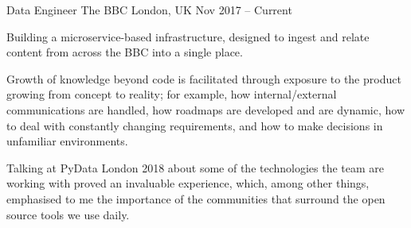 \begin{cventries}

     \cventry
     {Data Engineer}
     {The BBC}
     {London, UK}
     {Nov 2017 – Current}

     {
         \begin{cvitems}
         
             \item{Building a microservice-based infrastructure, designed to ingest and relate content from across the BBC into a single place.}
             \item{Growth of knowledge beyond code is facilitated through exposure to the product growing from concept to reality; for example, how internal/external communications are handled, how roadmaps are developed and are dynamic, how to deal with constantly changing requirements, and how to make decisions in unfamiliar environments.}
             \item{Talking at PyData London 2018 about some of the technologies the team are working with proved an invaluable experience, which, among other things, emphasised to me the importance of the communities that surround the open source tools we use daily.}
         
         \end{cvitems}
     }
 
\end{cventries}